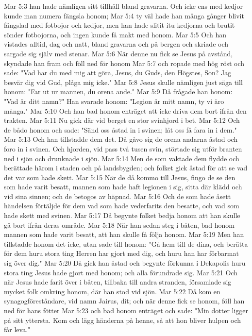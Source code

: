 Mar 5:3  han hade nämligen sitt tillhåll bland gravarna. Och icke ens med kedjor kunde man numera fängsla honom;
Mar 5:4  ty väl hade han många gånger blivit fängslad med fotbojor och kedjor, men han hade slitit itu kedjorna och brutit sönder fotbojorna, och ingen kunde få makt med honom.
Mar 5:5  Och han vistades alltid, dag och natt, bland gravarna och på bergen och skriade och sargade sig själv med stenar.
Mar 5:6  När denne nu fick se Jesus på avstånd, skyndade han fram och föll ned för honom
Mar 5:7  och ropade med hög röst och sade: "Vad har du med mig att göra, Jesus, du Guds, den Högstes, Son? Jag besvär dig vid Gud, plåga mig icke."
Mar 5:8  Jesus skulle nämligen just säga till honom: "Far ut ur mannen, du orena ande."
Mar 5:9  Då frågade han honom: "Vad är ditt namn?" Han svarade honom: "Legion är mitt namn, ty vi äro många."
Mar 5:10  Och han bad honom enträget att icke driva dem bort ifrån den trakten.
Mar 5:11  Nu gick där vid berget en stor svinhjord i bet.
Mar 5:12  Och de bådo honom och sade: "Sänd oss åstad in i svinen; låt oss få fara in i dem."
Mar 5:13  Och han tillstadde dem det. Då gåvo sig de orena andarna åstad och foro in i svinen. Och hjorden, vid pass två tusen svin, störtade sig utför branten ned i sjön och drunknade i sjön.
Mar 5:14  Men de som vaktade dem flydde och berättade härom i staden och på landsbygden; och folket gick åstad för att se vad det var som hade skett.
Mar 5:15  När de då kommo till Jesus, fingo de se den som hade varit besatt, mannen som hade haft legionen i sig, sitta där klädd och vid sina sinnen; och de betogos av häpnad.
Mar 5:16  Och de som hade åsett händelsen förtäljde för dem vad som hade vederfarits den besatte, och vad som hade skett med svinen.
Mar 5:17  Då begynte folket bedja honom att han skulle gå bort ifrån deras område.
Mar 5:18  När han sedan steg i båten, bad honom mannen som hade varit besatt, att han skulle få följa honom.
Mar 5:19  Men han tillstadde honom det icke, utan sade till honom: "Gå hem till de dina, och berätta för dem huru stora ting Herren har gjort med dig, och huru han har förbarmat sig över dig."
Mar 5:20  Då gick han åstad och begynte förkunna i Dekapolis huru stora ting Jesus hade gjort med honom; och alla förundrade sig.
Mar 5:21  Och när Jesus hade farit över i båten, tillbaka till andra stranden, församlade sig mycket folk omkring honom, där han stod vid sjön.
Mar 5:22  Då kom en synagogföreståndare, vid namn Jairus, dit; och när denne fick se honom, föll han ned för hans fötter
Mar 5:23  och bad honom enträget och sade: "Min dotter ligger på sitt yttersta. Kom och lägg händerna på henne, så att hon bliver hulpen och får leva."
